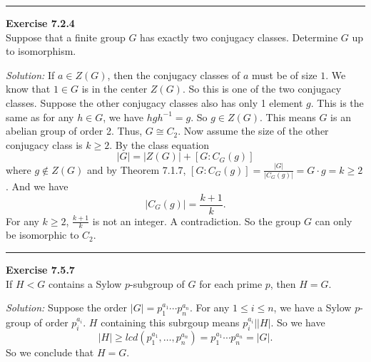 \documentclass[a4paper, 12pt]{article}
\newenvironment{problem}[2][Exercise]
    { \begin{mdframed}[backgroundcolor=gray!20] \textbf{#1 #2} \\}
    {  \end{mdframed}}
\newenvironment{solution}
    {\textit{Solution:}}
    {}
\begin{document}
\noindent\rule{7in}{2.8pt}
\begin{problem}{7.2.4}
Suppose that a finite group \(G\) has exactly two conjugacy classes. Determine \(G\) up to isomorphism.
\end{problem}
\begin{solution}
If \(a\in Z(G)\), then the conjugacy classes of \(a\) must be of size \(1\). We know that \(1\in G\) is in the center \(Z(G)\). So this is one of the two conjugacy classes. Suppose the other conjugacy classes also has only 1 
element \(g\). This is the same as for any \(h\in G\), we have \(hgh^{-1}=g\). So \(g\in Z(G)\). This means \(G\) is an abelian group of order 2. Thus, \(G\cong C_2\). Now assume the size of the other conjugacy class is \(k\geq 2\). By the class 
equation 
\[|G|=|Z(G)|+[G:C_G(g)]\]
where \(g\notin Z(G)\) and by Theorem 7.1.7, \([G:C_G(g)]=\frac{|G|}{|C_G(g)|}=G\cdot g=k\geq 2\). And we have 
\[|C_G(g)|=\frac{k+1}{k}.\]
For any \(k\geq 2\), \(\frac{k+1}{k}\) is not an integer. A contradiction. So the group \(G\) can only be isomorphic to \(C_2\).   
\end{solution}

\noindent\rule{7in}{2.8pt}
\begin{problem}{7.5.7}
If \(H<G\) contains a Sylow \(p\)-subgroup of \(G\) for each prime \(p\), then \(H=G\).
\end{problem}
\begin{solution}
Suppose the order \(|G|=p_1^{a_1}\cdots p_n^{a_n}\). For any \(1\leq i\leq n\), we have a Sylow \(p\)-group of order \(p_i^{a_i}\). \(H\) containing this subrgoup means \(p_i^{a_i}||H|\). So we have 
\[|H|\geq lcd(p_1^{a_1},\ldots,p_n^{a_n})=p_1^{a_1}\cdots p_n^{a_n}=|G|.\]
So we conclude that \(H=G\).
\end{solution}
\end{document}
